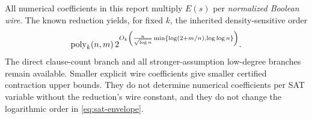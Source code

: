 All numerical coefficients in this report multiply $E(s)$ per
\emph{normalized Boolean wire}. The known reduction yields, for fixed $k$,
the inherited density-sensitive order
\begin{equation}\label{eq:sat-envelope}
 \operatorname{poly}_k(n,m)\,
 2^{O_k\left(\frac{n}{\sqrt{\log n}}
       \min\{\log(2+m/n),\log\log n\}\right)}.
\end{equation}
The direct clause-count branch and all stronger-assumption low-degree
branches remain available. Smaller explicit wire coefficients give smaller
certified contraction upper bounds. They do not determine numerical
coefficients per SAT variable without the reduction's wire constant, and
they do not change the logarithmic order in \eqref{eq:sat-envelope}.
